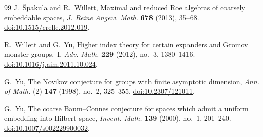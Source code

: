 \begin{thebibliography}{99}
J.~\v{S}pakula and R.~Willett,
Maximal and reduced Roe algebras of coarsely embeddable spaces,
\emph{J. Reine Angew. Math.} \textbf{678} (2013), 35--68.
\href{https://doi.org/10.1515/crelle.2012.019}{doi:10.1515/crelle.2012.019}.

R.~Willett and G.~Yu,
Higher index theory for certain expanders and Gromov monster groups,~I,
\emph{Adv. Math.} \textbf{229} (2012), no.~3, 1380--1416.
\href{https://doi.org/10.1016/j.aim.2011.10.024}{doi:10.1016/j.aim.2011.10.024}.

G.~Yu,
The Novikov conjecture for groups with finite asymptotic dimension,
\emph{Ann. of Math.} (2) \textbf{147} (1998), no.~2, 325--355.
\href{https://doi.org/10.2307/121011}{doi:10.2307/121011}.

G.~Yu,
The coarse Baum--Connes conjecture for spaces which admit a uniform embedding
into Hilbert space,
\emph{Invent. Math.} \textbf{139} (2000), no.~1, 201--240.
\href{https://doi.org/10.1007/s002229900032}{doi:10.1007/s002229900032}.

\end{thebibliography}
